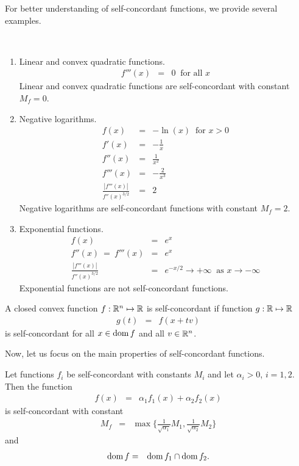 For better understanding of self-concordant functions, we provide several examples.

\begin{example}~
  \begin{enumerate}
    \item Linear and convex quadratic functions.
      \begin{eqnarray}
        f'''(x) &=& 0\ \text{ for all } x
      \end{eqnarray}
      Linear and convex quadratic functions are self-concordant with constant $M_f = 0$.
    \item Negative logarithms.
      \begin{eqnarray}
        f(x) &=& -\ln(x)\ \text{ for } x>0\\
        f'(x) &=& -\frac{1}{x}\\
        f''(x) &=& \frac{1}{x^2}\\
        f'''(x) &=& -\frac{2}{x^3}\\
        \frac{|f'''(x)|}{f''(x)^{3/2}} &=& 2
      \end{eqnarray}
      Negative logarithms are self-concordant functions with constant $M_f = 2$.

    \item Exponential functions.
      \begin{eqnarray}
        f(x) &=& e^x\\
        f''(x) \ =\ f'''(x) &=& e^x\\
        \frac{|f'''(x)|}{f''(x)^{3/2}} &=& e^{-x/2} \rightarrow+\infty \ \text{ as } x\rightarrow-\infty
      \end{eqnarray}
      Exponential functions are not self-concordant functions.
  \end{enumerate}
\end{example}

\begin{definition}
  A closed convex function $f: \mathbb{R}^n \mapsto \mathbb{R}$ is self-concordant if function $g: \mathbb{R} \mapsto \mathbb{R}$
  \begin{eqnarray}
    g(t) &=& f(x + tv)
  \end{eqnarray}
  is self-concordant for all $x\in\operatorname{dom} f$ and all $v\in\mathbb{R}^n$.
\end{definition}

Now, let us focus on the main properties of self-concordant functions.

\begin{theorem}
  Let functions $f_i$ be self-concordant with constants $M_i$  and let $\alpha_i > 0$, $i = 1,2$. Then the function
 \begin{eqnarray}
   f(x) &=& \alpha_1f_1(x) + \alpha_2f_2(x)
 \end{eqnarray}
 is self-concordant with constant
 \begin{eqnarray}
   M_f &=& \max \bigg\{\frac{1}{\sqrt{\alpha_1}}M_1, \frac{1}{\sqrt{\alpha_2}}M_2\bigg\}
 \end{eqnarray}
 and
 \begin{eqnarray}
   \operatorname{dom} f &=& \operatorname{dom} f_1 \cap \operatorname{dom} f_2.
 \end{eqnarray}
\end{theorem}

